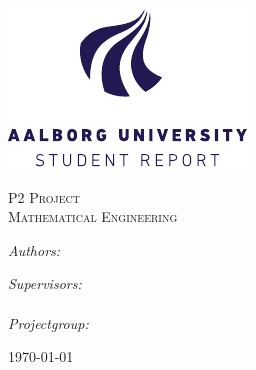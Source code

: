 \begin{titlepage}
  \centering

  \vspace{2cm}

  {\huge\bfseries\projecttitle}
  
  \vspace{0.5cm}
  
  {\Large\bfseries\sffamily\projectsubtitle}
    
  \vspace{2cm}

  \includegraphics[scale = 3]{figures/aau-report-badge.pdf}
  \vspace{1cm}
  
  \textsc{\LARGE P2 Project}\\
  \textsc{\Large Mathematical Engineering}

\vspace{1cm}

  \begin{minipage}[t]{0.4\textwidth}
    \begin{flushleft}
      \large
      \emph{Authors:\\}
      \projectauthors
    \end{flushleft}
  \end{minipage}
  \begin{minipage}[t]{0.4\textwidth}
    \begin{flushright}
      \large
      \emph{Supervisors:}\\
      \projectsupervisors\\
      \vspace{1.0cm}
      \emph{Projectgroup:}\\
      \projectgroup
    \end{flushright}
  \end{minipage}

  \vfill

  {\large\today}
\end{titlepage}